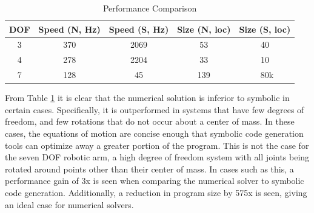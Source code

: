 \begin{table}[H]
\centering
\begin{tabular}{||c c c c c||} 
 \hline
 DOF & Speed (N, Hz) & Speed (S, Hz) & Size (N, loc) & Size (S, loc)\\ [0.5ex] 
 \hline\hline
 3 & 370 & 2069 & 53  & 40\\ 
 \hline
 4 & 278 & 2204 & 33   & 10 \\
 \hline
 7 & 128 & 45 & 139   & ~80k \\
 \hline
\end{tabular}
\caption{Performance Comparison }
\label{tab:perf}
\end{table}

From Table \ref{tab:perf} it is clear that the numerical solution is inferior to symbolic in certain cases. Specifically, it is outperformed in systems that have few degrees of freedom, and few rotations that do not occur about a center of mass. In these cases, the equations of motion are concise enough that symbolic code generation tools can optimize away a greater portion of the program. This is not the case for the seven DOF robotic arm, a high degree of freedom system with all joints being rotated around points other than their center of mass. In cases such as this, a performance gain of 3x is seen when comparing the numerical solver to symbolic code generation. Additionally, a reduction in program size by 575x is seen, giving an ideal case for numerical solvers.